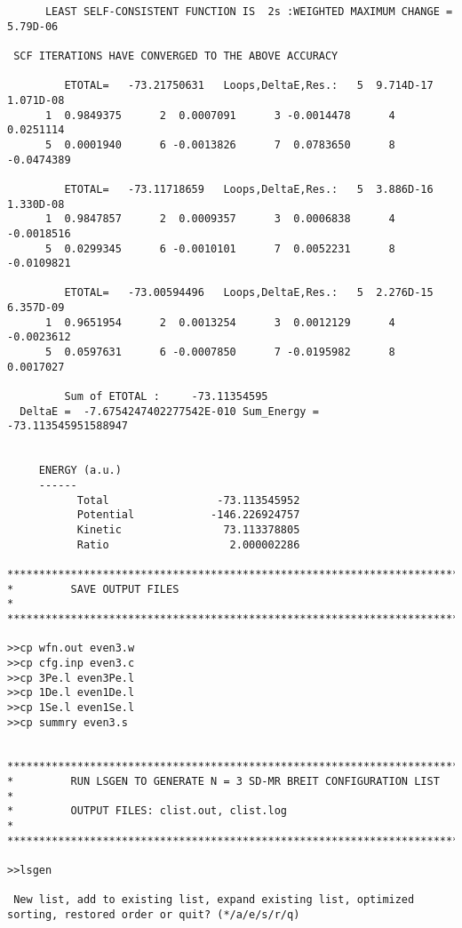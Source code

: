 \documentclass[fleqn,10pt]{book}
\begin{document}
\begin{verbatim}
      LEAST SELF-CONSISTENT FUNCTION IS  2s :WEIGHTED MAXIMUM CHANGE =  5.79D-06

 SCF ITERATIONS HAVE CONVERGED TO THE ABOVE ACCURACY

         ETOTAL=   -73.21750631   Loops,DeltaE,Res.:   5  9.714D-17  1.071D-08
      1  0.9849375      2  0.0007091      3 -0.0014478      4  0.0251114
      5  0.0001940      6 -0.0013826      7  0.0783650      8 -0.0474389

         ETOTAL=   -73.11718659   Loops,DeltaE,Res.:   5  3.886D-16  1.330D-08
      1  0.9847857      2  0.0009357      3  0.0006838      4 -0.0018516
      5  0.0299345      6 -0.0010101      7  0.0052231      8 -0.0109821

         ETOTAL=   -73.00594496   Loops,DeltaE,Res.:   5  2.276D-15  6.357D-09
      1  0.9651954      2  0.0013254      3  0.0012129      4 -0.0023612
      5  0.0597631      6 -0.0007850      7 -0.0195982      8  0.0017027

         Sum of ETOTAL :     -73.11354595
  DeltaE =  -7.6754247402277542E-010 Sum_Energy =   -73.113545951588947     


     ENERGY (a.u.)
     ------
           Total                 -73.113545952
           Potential            -146.226924757
           Kinetic                73.113378805
           Ratio                   2.000002286

*******************************************************************************
*         SAVE OUTPUT FILES                                                   * 
*******************************************************************************

>>cp wfn.out even3.w
>>cp cfg.inp even3.c
>>cp 3Pe.l even3Pe.l
>>cp 1De.l even1De.l
>>cp 1Se.l even1Se.l
>>cp summry even3.s


*******************************************************************************
*         RUN LSGEN TO GENERATE N = 3 SD-MR BREIT CONFIGURATION LIST          *
*         OUTPUT FILES: clist.out, clist.log                                  *
*******************************************************************************

>>lsgen

 New list, add to existing list, expand existing list, optimized sorting, restored order or quit? (*/a/e/s/r/q)


\end{verbatim}
\end{document}
